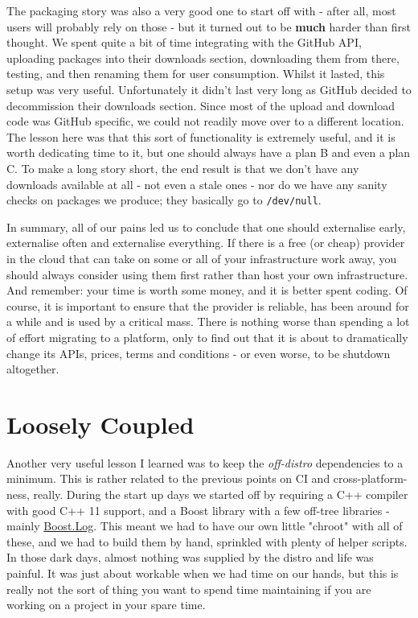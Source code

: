 \documentclass{book}
\begin{document}
The packaging story was also a very good one to start off with - after
all, most users will probably rely on those - but it turned out to be
\textbf{much} harder than first thought. We spent quite a bit of time
integrating with the GitHub API, uploading packages into their
downloads section, downloading them from there, testing, and then
renaming them for user consumption. Whilst it lasted, this setup was
very useful. Unfortunately it didn't last very long as GitHub decided
to decommission their downloads section. Since most of the upload and
download code was GitHub specific, we could not readily move over to a
different location. The lesson here was that this sort of
functionality is extremely useful, and it is worth dedicating time to
it, but one should always have a plan B and even a plan C. To make a
long story short, the end result is that we don't have any downloads
available at all - not even a stale ones - nor do we have any sanity
checks on packages we produce; they basically go to \texttt{/dev/null}.

In summary, all of our pains led us to conclude that one should
externalise early, externalise often and externalise everything. If
there is a free (or cheap) provider in the cloud that can take on some
or all of your infrastructure work away, you should always consider
using them first rather than host your own infrastructure. And
remember: your time is worth some money, and it is better spent
coding. Of course, it is important to ensure that the provider is
reliable, has been around for a while and is used by a critical
mass. There is nothing worse than spending a lot of effort migrating
to a platform, only to find out that it is about to dramatically
change its APIs, prices, terms and conditions - or even worse, to be
shutdown altogether.

\section*{Loosely Coupled}
\label{sec-5}

Another very useful lesson I learned was to keep the \emph{off-distro}
dependencies to a minimum. This is rather related to the previous
points on CI and cross-platform-ness, really. During the start up days
we started off by requiring a C++ compiler with good C++ 11 support,
and a Boost library with a few off-tree libraries - mainly
\href{http://www.boost.org/doc/libs/1_56_0/libs/log/doc/html/index.html}{Boost.Log}. This meant we had to have our own little "chroot" with all
of these, and we had to build them by hand, sprinkled with plenty of
helper scripts. In those dark days, almost nothing was supplied by the
distro and life was painful. It was just about workable when we had
time on our hands, but this is really not the sort of thing you want
to spend time maintaining if you are working on a project in your
spare time.
\end{document}
